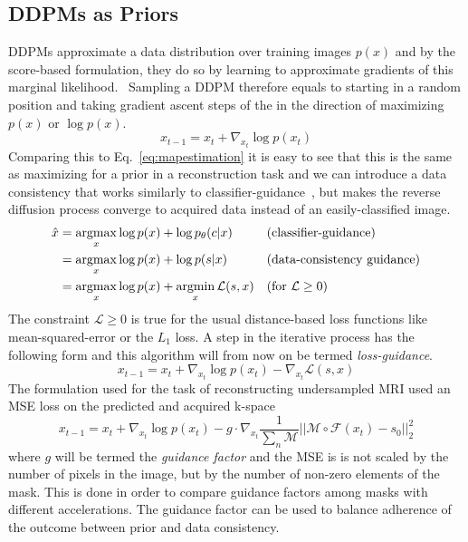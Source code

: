 \subsection{DDPMs as Priors}
DDPMs approximate a data distribution over training images $p(x)$ and by the score-based formulation, they do so by learning to approximate gradients of this marginal likelihood.~\autocite{song2020generative} Sampling a DDPM therefore equals to starting in a random position and taking gradient ascent steps of the in the direction of maximizing $p(x)$ or $\log p(x)$.
\begin{equation}
    \label{eq:ddpmiteration}
    x_{t-1} = x_{t} + \nabla_{x_t} \log p(x_t)
\end{equation}
Comparing this to Eq.~\ref{eq:mapestimation} it is easy to see that this is the same as maximizing for a prior in a reconstruction task and we can introduce a data consistency that works similarly to classifier-guidance~\autocite{dhariwal2021diffusion}, but makes the reverse diffusion process converge to acquired data instead of an easily-classified image.
\begin{align}
    \hat{x} & = \operatorname*{argmax}_x \log p(x) + \log p_{\theta}(c|x)        &  & \text{(classifier-guidance)}       \\
            & = \operatorname*{argmax}_x \log p(x) + \log p(s|x)                 &  & \text{(data-consistency guidance)} \\
            & = \operatorname*{argmax}_x \log p(x) + \operatorname*{argmin}_x \mathcal{L}(s, x) &  & \text{(for $\mathcal{L} \geq 0$)}  \\
\end{align}
The constraint $\mathcal{L} \geq 0$ is true for the usual distance-based loss functions like mean-squared-error or the $L_1$ loss. A step in the iterative process has the following form and this algorithm will from now on be termed \textit{loss-guidance}.
\begin{equation}
    x_{t-1} = x_{t} + \nabla_{x_t} \log p(x_t) - \nabla_{x_t} \mathcal{L}(s, x)
\end{equation}
The formulation used for the task of reconstructing undersampled MRI used an MSE loss on the predicted and acquired k-space
\begin{equation}
    x_{t-1} = x_{t} + \nabla_{x_t} \log p(x_t) - g \cdot \nabla_{x_t} \frac{1}{\sum_n \mathcal{M}}||\mathcal{M} \circ \mathcal{F}(x_t) - s_0||_2^2
\end{equation}
where $g$ will be termed the \textit{guidance factor} and the MSE is is not scaled by the number of pixels in the image, but by the number of non-zero elements of the mask. This is done in order to compare guidance factors among masks with different accelerations. The guidance factor can be used to balance adherence of the outcome between prior and data consistency.

